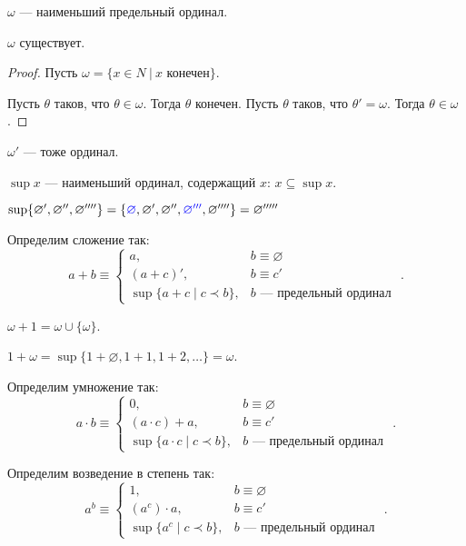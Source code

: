\begin{definition}
   $\omega$ --- наименьший предельный ординал.
\end{definition}
\begin{theorem}
   $\omega$ существует.
\end{theorem}
\begin{proof}
   Пусть $\omega = \{ x \in N\ |\ x\text{ конечен}\}$.

   Пусть $\theta$ таков, что $\theta \in \omega$. Тогда $\theta$ конечен.
Пусть $\theta$ таков, что $\theta' = \omega$. Тогда $\theta \in \omega$.
\end{proof}
\begin{example}
   $\omega'$ --- тоже ординал.
\end{example}

\begin{definition}
   $\sup x$ --- наименьший ординал, содержащий $x$: $x \subseteq \sup x$.
\end{definition}
\begin{example}
   $\sup \{ \varnothing', \varnothing'', \varnothing'''' \} = \{ {\color{blue}\varnothing},
   \varnothing', \varnothing'', {\color{blue} \varnothing '''}, \varnothing'''' \} =  \varnothing'''''$\end{example}

\begin{definition}
   Определим сложение так:
   \[ a + b \equiv \left\{ \begin{array}{rl}
      a, & b \equiv \varnothing\\
      (a + c)', & b \equiv c'\\
      \sup \{ a+c \mid c \prec b \}, &\mbox{$b$ --- предельный ординал }\end{array}\right.. \]
\end{definition}

\begin{example}
   $\omega + 1 = \omega \cup \{\omega\}$.

   $1 + \omega = \sup\{ 1+\varnothing, 1+1, 1+2, \dots \}  = \omega$.
\end{example}


\begin{definition}
   Определим умножение так:
\[ a \cdot b \equiv \left\{ \begin{array}{rl}
   0, & b \equiv \varnothing\\
   (a \cdot c) + a, & b \equiv c'\\
   \sup \{ a \cdot c \mid c \prec b \}, &\mbox{$b$ --- предельный ординал }\end{array}\right..\]
\end{definition}
\begin{definition}
   Определим возведение в степень так:
\[ a ^ b \equiv \left\{ \begin{array}{rl}
   1, & b \equiv \varnothing\\
   (a ^ c) \cdot a, & b \equiv c'\\
   \sup \{ a^c \mid c \prec b \}, &\mbox{$b$ --- предельный ординал }\end{array}\right.. \]
\end{definition}

